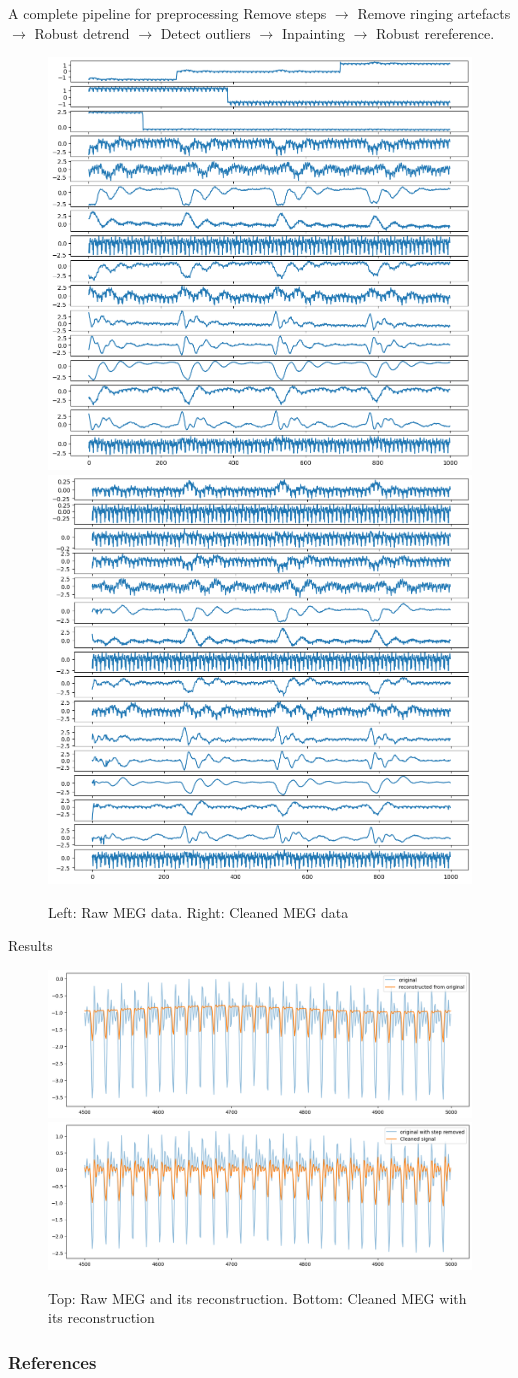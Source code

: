 \documentclass[10pt,serif]{beamer}
\begin{document}
\begin{frame}{A complete pipeline for preprocessing}
    Remove steps \(\to\) Remove ringing artefacts \(\to\) Robust detrend \(\to\) Detect outliers \(\to\) Inpainting \(\to\) Robust rereference.
    \begin{figure}
        \centering
        \includegraphics[width=.4\textwidth]{figures/data_raw.png}
        \includegraphics[width=.4\textwidth]{figures/data_clean.png}
        \caption{Left: Raw MEG data. Right: Cleaned MEG data}
        \label{fig:data}
    \end{figure}
\end{frame}

\begin{frame}{Results}
    \begin{figure}
        \centering
        \includegraphics[width=.65\textwidth]{figures/recons}\\
        \includegraphics[width=.65\textwidth]{figures/recons_clean}
        \caption{Top: Raw MEG and its reconstruction. Bottom: Cleaned MEG with its reconstruction}
        \label{fig:recons}
    \end{figure}
\end{frame}

\begin{frame}[allowframebreaks]
    \frametitle{References}
    \printbibliography
\end{frame}
\end{document}
